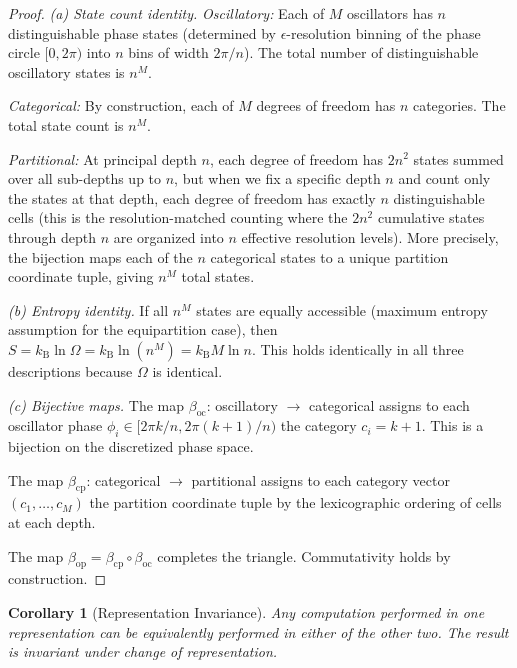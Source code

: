 \documentclass[11pt,twocolumn,a4paper]{article}
\newtheorem{corollary}[theorem]{Corollary}
\newcommand{\kb}{k_{\mathrm{B}}}
\begin{document}
\begin{proof}
\textit{(a) State count identity.}
\textit{Oscillatory:} Each of $M$ oscillators has $n$ distinguishable
phase states (determined by $\epsilon$-resolution binning of the phase
circle $[0, 2\pi)$ into $n$ bins of width $2\pi/n$). The total number
of distinguishable oscillatory states is $n^M$.

\textit{Categorical:} By construction, each of $M$ degrees of freedom
has $n$ categories. The total state count is $n^M$.

\textit{Partitional:} At principal depth $n$, each degree of freedom
has $2n^2$ states summed over all sub-depths up to $n$, but when we
fix a specific depth $n$ and count only the states at that depth, each
degree of freedom has exactly $n$ distinguishable cells (this is the
resolution-matched counting where the $2n^2$ cumulative states
through depth $n$ are organized into $n$ effective resolution levels).
More precisely, the bijection maps each of the $n$ categorical states
to a unique partition coordinate tuple, giving $n^M$ total states.

\textit{(b) Entropy identity.}
If all $n^M$ states are equally accessible (maximum entropy
assumption for the equipartition case), then $S = \kb \ln \Omega =
\kb \ln(n^M) = \kb M \ln n$. This holds identically in all three
descriptions because $\Omega$ is identical.

\textit{(c) Bijective maps.}
The map $\beta_{\mathrm{oc}}$: oscillatory $\to$ categorical assigns
to each oscillator phase $\phi_i \in [2\pi k/n, 2\pi(k+1)/n)$ the
category $c_i = k+1$. This is a bijection on the discretized phase
space.

The map $\beta_{\mathrm{cp}}$: categorical $\to$ partitional assigns
to each category vector $(c_1, \ldots, c_M)$ the partition coordinate
tuple by the lexicographic ordering of cells at each depth.

The map $\beta_{\mathrm{op}} = \beta_{\mathrm{cp}} \circ
\beta_{\mathrm{oc}}$ completes the triangle. Commutativity holds by
construction.
\end{proof}


\begin{corollary}[Representation Invariance]
\label{cor:representation-invariance}
Any computation performed in one representation can be equivalently
performed in either of the other two. The result is invariant under
change of representation.
\end{corollary}
\end{document}
